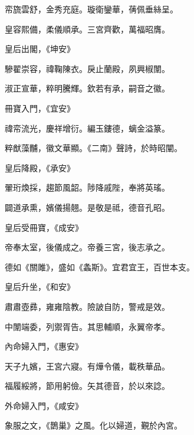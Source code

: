\begin{pinyinscope}
 帟旒雲舒，金秀充庭。璇衛鑾華，蒨佩垂絲呈。



 皇容熙備，柔儀順承。三宮齊歡，萬福昭膺。



 皇后出閣，《坤安》



 驂翟崇容，禕鞠陳衣。戾止蘭殿，夙興椒闈。



 淑正宣華，粹明騰輝。欽若有承，嗣音之徽。



 冊寶入門，《宜安》



 禕帟流光，慶祥增衍。編玉鏤德，螭金溢篆。



 粹猷藻黼，徽文華顯。《二南》聲詩，於時昭闡。



 皇后降殿，《承安》



 翬珩煥採，趨節風韶。陟降戚陛，奉將英瑤。



 闢道承熏，嬪儀揚翹。是敬是祗，德音孔昭。



 皇后受冊寶，《成安》



 帝奉太室，後儀成之。帝養三宮，後志承之。



 德如《關雎》，盛如《螽斯》。宜君宜王，百世本支。



 皇后升坐，《和安》



 肅肅壺彞，雍雍陰教。險詖自防，警戒是效。



 中闈端委，列禦胥告。其思輔順，永翼帝孝。



 內命婦入門，《惠安》



 天子九嬪，王宮六寢。有燁令儀，載秩華品。



 福履綏將，節用躬儉。矢其德音，於以來諗。



 外命婦入門，《咸安》



 象服之文，《鵲巢》之風。化以婦道，覲於內宮。




\end{pinyinscope}
